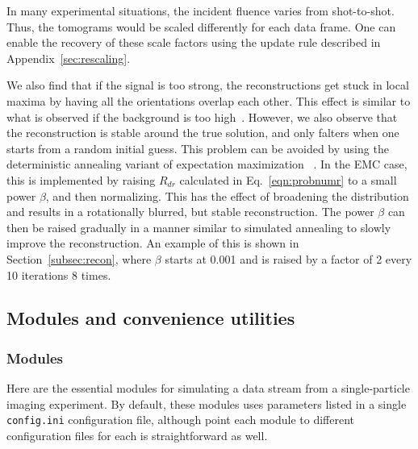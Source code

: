 \documentclass[]{iucr}              %
\begin{document}
In many experimental situations, the incident fluence varies from shot-to-shot. Thus, the tomograms would be scaled differently for each data frame. One can enable the recovery of these scale factors using the update rule described in Appendix~\ref{sec:rescaling}. 

We also find that if the signal is too strong, the reconstructions get stuck in local maxima by having all the orientations overlap each other. This effect is similar to what is observed if the background is too high~\cite{ayyer2015}. However, we also observe that the reconstruction is stable around the true solution, and only falters when one starts from a random initial guess. This problem can be avoided by using the deterministic annealing variant of expectation maximization ~\cite{ueda1998}. In the EMC case, this is implemented by raising $R_{dr}$ calculated in Eq.~\ref{eqn:probnumr} to a small power $\beta$, and then normalizing. This has the effect of broadening the distribution and results in a rotationally blurred, but stable reconstruction. The power $\beta$ can then be raised gradually in a manner similar to simulated annealing to slowly improve the reconstruction. An example of this is shown in Section~\ref{subsec:recon}, where $\beta$ starts at 0.001 and is raised by a factor of 2 every 10 iterations 8 times.

\subsection{Modules and convenience utilities}\label{subsec:mod+utils}
\subsubsection{Modules}\label{subsubsec:mods}
Here are the essential modules for simulating a data stream from a single-particle imaging experiment. By default, these modules uses parameters listed in a single \texttt{config.ini} configuration file, although point each module to different configuration files for each is straightforward as well.
\end{document}
